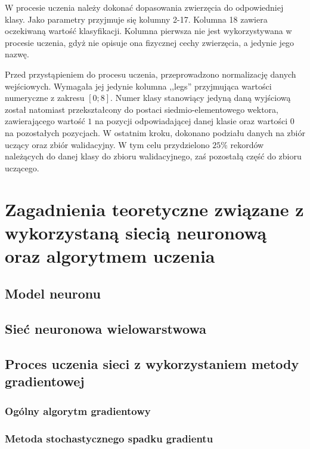 \documentclass[12pt,twoside]{article}
\begin{document}
W procesie uczenia należy dokonać dopasowania zwierzęcia do odpowiedniej klasy.
Jako parametry przyjmuje się kolumny 2-17.
Kolumna 18 zawiera oczekiwaną wartość klasyfikacji.
Kolumna pierwsza nie jest wykorzystywana w procesie uczenia, gdyż nie opisuje ona fizycznej cechy zwierzęcia, a jedynie jego nazwę.

Przed przystąpieniem do procesu uczenia, przeprowadzono normalizację danych wejściowych. Wymagała jej jedynie kolumna ,,legs'' przyjmująca wartości numeryczne z zakresu $[0;8]$.
Numer klasy stanowiący jedyną daną wyjściową został natomiast przekształcony do postaci siedmio-elementowego wektora, zawierającego wartość $1$ na pozycji odpowiadającej danej klasie oraz wartości $0$ na pozostałych pozycjach.
W ostatnim kroku, dokonano podziału danych na zbiór uczący oraz zbiór walidacyjny.
W tym celu przydzielono $25\%$ rekordów należących do danej klasy do zbioru walidacyjnego, zaś pozostałą część do zbioru uczącego.

\section{Zagadnienia teoretyczne związane z wykorzystaną siecią neuronową oraz algorytmem uczenia}
\subsection{Model neuronu}
\subsection{Sieć neuronowa wielowarstwowa}
\subsection{Proces uczenia sieci z wykorzystaniem metody gradientowej}
\subsubsection{Ogólny algorytm gradientowy}
\subsubsection{Metoda stochastycznego spadku gradientu}
\end{document}
